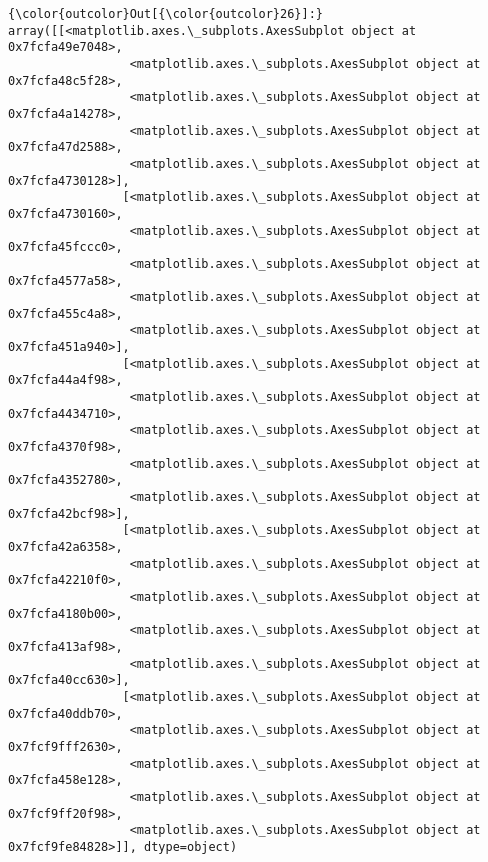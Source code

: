 \documentclass[11pt]{article}
\begin{document}
\begin{Verbatim}[commandchars=\\\{\}]
{\color{outcolor}Out[{\color{outcolor}26}]:} array([[<matplotlib.axes.\_subplots.AxesSubplot object at 0x7fcfa49e7048>,
                 <matplotlib.axes.\_subplots.AxesSubplot object at 0x7fcfa48c5f28>,
                 <matplotlib.axes.\_subplots.AxesSubplot object at 0x7fcfa4a14278>,
                 <matplotlib.axes.\_subplots.AxesSubplot object at 0x7fcfa47d2588>,
                 <matplotlib.axes.\_subplots.AxesSubplot object at 0x7fcfa4730128>],
                [<matplotlib.axes.\_subplots.AxesSubplot object at 0x7fcfa4730160>,
                 <matplotlib.axes.\_subplots.AxesSubplot object at 0x7fcfa45fccc0>,
                 <matplotlib.axes.\_subplots.AxesSubplot object at 0x7fcfa4577a58>,
                 <matplotlib.axes.\_subplots.AxesSubplot object at 0x7fcfa455c4a8>,
                 <matplotlib.axes.\_subplots.AxesSubplot object at 0x7fcfa451a940>],
                [<matplotlib.axes.\_subplots.AxesSubplot object at 0x7fcfa44a4f98>,
                 <matplotlib.axes.\_subplots.AxesSubplot object at 0x7fcfa4434710>,
                 <matplotlib.axes.\_subplots.AxesSubplot object at 0x7fcfa4370f98>,
                 <matplotlib.axes.\_subplots.AxesSubplot object at 0x7fcfa4352780>,
                 <matplotlib.axes.\_subplots.AxesSubplot object at 0x7fcfa42bcf98>],
                [<matplotlib.axes.\_subplots.AxesSubplot object at 0x7fcfa42a6358>,
                 <matplotlib.axes.\_subplots.AxesSubplot object at 0x7fcfa42210f0>,
                 <matplotlib.axes.\_subplots.AxesSubplot object at 0x7fcfa4180b00>,
                 <matplotlib.axes.\_subplots.AxesSubplot object at 0x7fcfa413af98>,
                 <matplotlib.axes.\_subplots.AxesSubplot object at 0x7fcfa40cc630>],
                [<matplotlib.axes.\_subplots.AxesSubplot object at 0x7fcfa40ddb70>,
                 <matplotlib.axes.\_subplots.AxesSubplot object at 0x7fcf9fff2630>,
                 <matplotlib.axes.\_subplots.AxesSubplot object at 0x7fcfa458e128>,
                 <matplotlib.axes.\_subplots.AxesSubplot object at 0x7fcf9ff20f98>,
                 <matplotlib.axes.\_subplots.AxesSubplot object at 0x7fcf9fe84828>]], dtype=object)
\end{Verbatim}
            
    \begin{center}
    \end{center}
    { \hspace*{\fill} \\}
    
\end{document}
